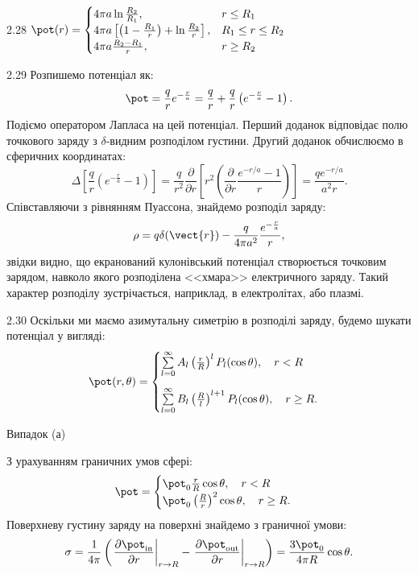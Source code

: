 \begin{Solution}{2.{28}}
	$
		\pot(r) =
		\begin{cases}
			4\pi a\ln\frac{R_2}{R_1},                                                  & r \le R_1         \\
			4\pi a \left[ \left( 1- \frac{R_1}{r}\right)  + \ln\frac{R_2}{r} \right] , & R_1 \le r \le R_2 \\
			4\pi a \frac{R_2 - R_1}{r},                                                & r \ge R_2
		\end{cases}
	$
\end{Solution}
\begin{Solution}{2.{29}}
	Розпишемо потенціал як:
    \[
	\pot = \frac{q}{r}e^{-\frac{r}{a}} = \frac{q}{r} +  \frac{q}{r}\left(e^{-\frac{r}{a}} - 1\right) .
    \]
    Подіємо оператором Лапласа на цей потенціал. Перший доданок відповідає полю точкового заряду з  $\delta$-видним розподілом густини. Другий доданок обчислюємо в сферичних координатах:
    \[
        \Delta \left[\frac{q}{r}\left(e^{-\frac{r}{a}} - 1\right) \right] =
    \frac{q}{r^2}\frac{\partial}{\partial r}\left[ r^2\left( \frac{\partial }{\partial r}\frac{e^{-r/a} - 1}{r} \right) \right] = \frac{qe^{-r/a}}{a^2r}.
    \]
	Співставляючи з рівнянням Пуассона, знайдемо розподіл заряду:
	\[
		\rho = q\delta(\vect{r}) - \frac{q}{4\pi a^2} \frac{e^{-\frac{r}{a}}}{r},
	\]
	звідки видно, що екранований кулонівський потенціал створюється точковим зарядом, навколо якого розподілена <<хмара>> електричного заряду. Такий характер розподілу зустрічається, наприклад, в електролітах, або плазмі.
\end{Solution}
\begin{Solution}{2.{30}}
	Оскільки ми маємо азимутальну симетрію в розподілі заряду, будемо шукати потенціал у вигляді:
	\begin{equation}
		\pot(r, \theta) = \begin{cases}
			\sum\limits_{l=0}^{\infty}A_l \left( \frac{r}{R}\right)^l P_l(\cos\theta), \quad r<R \\[1.5em]
			\sum\limits_{l=0}^{\infty}B_l \left( \frac{R}{l}\right)^{l+1} P_l(\cos\theta), \quad r \ge R.
		\end{cases}
	\end{equation}

	Випадок (а)

	З урахуванням граничних умов сфері:
	\begin{equation}
		\pot = \begin{cases}
			\pot_0\frac{r}{R} \cos\theta, \quad r<R \\
			\pot_0\left( \frac{R}{r}\right)^2 \cos\theta, \quad r \ge R.
		\end{cases}
	\end{equation}
	Поверхневу густину заряду на поверхні знайдемо з граничної умови:
	\begin{equation}
		\sigma = \frac{1}{4\pi} \left( \left. \frac{\partial \pot_{\mathrm{in}}}{\partial r}\right|_{r \to R} - \left. \frac{\partial \pot_{\mathrm{out}}}{\partial r}\right|_{r \to R} \right) =  \frac{3\pot_0}{4\pi R} \cos\theta.
	\end{equation}
\end{Solution}
